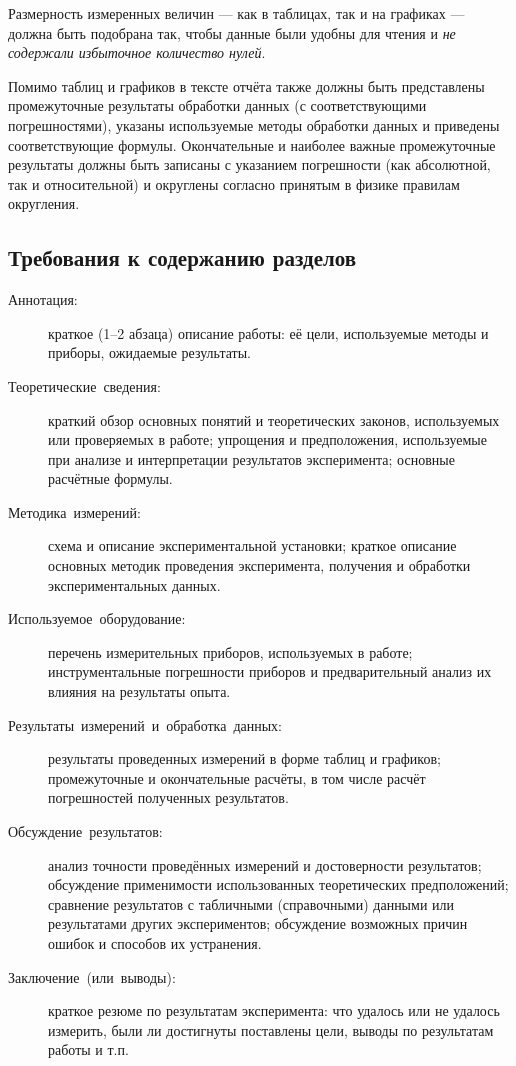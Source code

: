 Размерность измеренных величин --- как в таблицах, так и
на графиках --- должна быть подобрана так, чтобы данные
были удобны для чтения и \emph{не содержали избыточное количество
нулей}.

Помимо таблиц и графиков в тексте отчёта также должны быть представлены
промежуточные результаты обработки данных (с соответствующими погрешностями),
указаны используемые методы обработки данных и приведены соответствующие
формулы. Окончательные и наиболее важные промежуточные результаты
должны быть записаны с указанием погрешности (как абсолютной, так
и относительной) и округлены согласно принятым в физике правилам округления.

\subsection{Требования к содержанию разделов}
\begin{description}
\item [{Аннотация:}] краткое (1--2 абзаца) описание работы: её
цели, используемые методы и приборы, ожидаемые результаты.
\item [{Теоретические~сведения:}] краткий обзор основных понятий и теоретических
законов, используемых или проверяемых в работе; упрощения и предположения,
используемые при анализе и интерпретации результатов эксперимента;
основные расчётные формулы.
\item [{Методика~измерений:}] схема и описание экспериментальной установки;
краткое описание основных методик проведения эксперимента, получения
и обработки экспериментальных данных.
\item [{Используемое~оборудование:}] перечень измерительных приборов,
используемых в работе; инструментальные погрешности приборов и предварительный
анализ их влияния на результаты опыта.
\item [{Результаты~измерений~и~обработка~данных:}] результаты проведенных
измерений в форме таблиц и графиков; промежуточные и окончательные
расчёты, в том числе расчёт погрешностей полученных результатов.
\item [{Обсуждение~результатов:}] анализ точности проведённых измерений
и достоверности результатов; обсуждение применимости использованных
теоретических предположений; сравнение результатов с табличными (справочными)
данными или результатами других экспериментов; обсуждение возможных
причин ошибок и способов их устранения.
\item [{Заключение~(или~выводы):}] краткое резюме по результатам эксперимента:
что удалось или не удалось измерить, были ли достигнуты поставлены
цели, выводы по результатам работы и т.п.
\end{description}


